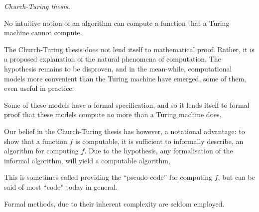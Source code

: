 \begin{hypothesis} \textit{Church-Turing thesis.}

No intuitive notion of an algorithm can compute a function that a Turing
machine cannot compute.

\end{hypothesis}

The Church-Turing thesis does not lend itself to mathematical proof. Rather, it
is a proposed explanation of the natural phenomena of computation. The
hypothesis remains to be disproven, and in the mean-while, computational models
more convenient than the Turing machine have emerged, some of them, even useful
in practice.

Some of these models have a formal specification, and so it lends itself to
formal proof that these models compute no more than a Turing machine does.

Our belief in the Church-Turing thesis has however, a notational advantage: to
show that a function $f$ is computable, it is sufficient to informally
describe, an algorithm for computing $f$. Due to the hypothesis, any
formalisation of the informal algorithm, will yield a computable algorithm,

This is sometimes called providing the ``pseudo-code'' for computing $f$, but can be said
of most ``code'' today in general.

Formal methods, due to their inherent complexity are seldom employed.
